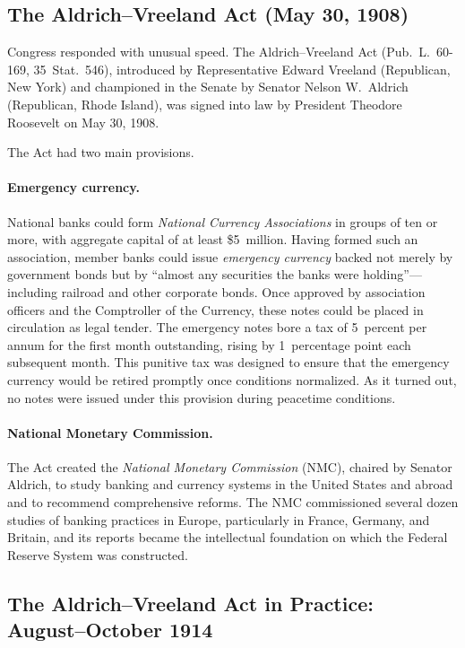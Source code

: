 \documentclass[12pt]{article}
\begin{document}
\subsection{The Aldrich--Vreeland Act (May 30, 1908)}

Congress responded with unusual speed.  The Aldrich--Vreeland Act (Pub.\ L.\
60-169, 35~Stat.\ 546), introduced by Representative Edward Vreeland
(Republican, New York) and championed in the Senate by Senator Nelson W.\ Aldrich
(Republican, Rhode Island), was signed into law by President Theodore Roosevelt on
May 30, 1908.

The Act had two main provisions.

\paragraph{Emergency currency.}  National banks could form \emph{National Currency
Associations} in groups of ten or more, with aggregate capital of at least
\$5~million.  Having formed such an association, member banks could issue
\emph{emergency currency} backed not merely by government bonds but by
``almost any securities the banks were holding''---including railroad and other
corporate bonds.  Once approved by association officers and the Comptroller of
the Currency, these notes could be placed in circulation as legal tender.  The
emergency notes bore a tax of 5~percent per annum for the first month outstanding,
rising by 1~percentage point each subsequent month.  This punitive tax was designed
to ensure that the emergency currency would be retired promptly once conditions
normalized.  As it turned out, no notes were issued under this provision during
peacetime conditions.

\paragraph{National Monetary Commission.}  The Act created the \emph{National
Monetary Commission} (NMC), chaired by Senator Aldrich, to study banking and
currency systems in the United States and abroad and to recommend comprehensive
reforms.  The NMC commissioned several dozen studies of banking practices in
Europe, particularly in France, Germany, and Britain, and its reports became the
intellectual foundation on which the Federal Reserve System was constructed.

\subsection{The Aldrich--Vreeland Act in Practice: August--October 1914}
\end{document}
